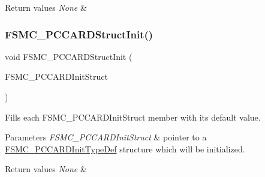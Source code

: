\begin{DoxyRetVals}{Return values}
{\em None} & \\
\hline
\end{DoxyRetVals}
\mbox{\label{group___f_s_m_c___private___functions_ga7a64ba0e0545b3f1913c9d1d28c05e62}} 
\subsubsection{\texorpdfstring{FSMC\_PCCARDStructInit()}{FSMC\_PCCARDStructInit()}}
{\footnotesize\ttfamily void F\+S\+M\+C\+\_\+\+P\+C\+C\+A\+R\+D\+Struct\+Init (\begin{DoxyParamCaption}\item[{\mbox{\hyperlink{struct_f_s_m_c___p_c_c_a_r_d_init_type_def}{F\+S\+M\+C\+\_\+\+P\+C\+C\+A\+R\+D\+Init\+Type\+Def}} $\ast$}]{F\+S\+M\+C\+\_\+\+P\+C\+C\+A\+R\+D\+Init\+Struct }\end{DoxyParamCaption})}



Fills each F\+S\+M\+C\+\_\+\+P\+C\+C\+A\+R\+D\+Init\+Struct member with its default value. 


\begin{DoxyParams}{Parameters}
{\em F\+S\+M\+C\+\_\+\+P\+C\+C\+A\+R\+D\+Init\+Struct} & pointer to a \mbox{\hyperlink{struct_f_s_m_c___p_c_c_a_r_d_init_type_def}{F\+S\+M\+C\+\_\+\+P\+C\+C\+A\+R\+D\+Init\+Type\+Def}} structure which will be initialized. \\
\hline
\end{DoxyParams}

\begin{DoxyRetVals}{Return values}
{\em None} & \\
\hline
\end{DoxyRetVals}
